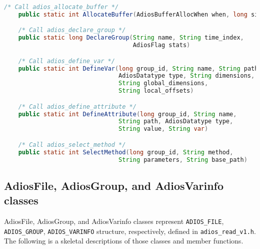 \begin{lstlisting}[language=Java,frame=single, backgroundcolor=\color{gray85},caption={Member functions in the Adios class},label={}]
    /* Call adios_allocate_buffer */
    public static int AllocateBuffer(AdiosBufferAllocWhen when, long size)

    /* Call adios_declare_group */
    public static long DeclareGroup(String name, String time_index, 
                                    AdiosFlag stats)

    /* Call adios_define_var */
    public static int DefineVar(long group_id, String name, String path, 
                                AdiosDatatype type, String dimensions, 
                                String global_dimensions, 
                                String local_offsets)

    /* Call adios_define_attribute */
    public static int DefineAttribute(long group_id, String name, 
                                String path, AdiosDatatype type, 
                                String value, String var)

    /* Call adios_select_method */
    public static int SelectMethod(long group_id, String method, 
                                String parameters, String base_path)
\end{lstlisting}

\subsection{AdiosFile, AdiosGroup, and AdiosVarinfo classes}
AdiosFile, AdiosGroup, and AdiosVarinfo classes represent \verb+ADIOS_FILE+, \verb+ADIOS_GROUP+, \verb+ADIOS_VARINFO+ structure, respectively, defined in \verb+adios_read_v1.h+. The following is a skeletal descriptions of those classes and member functions.

